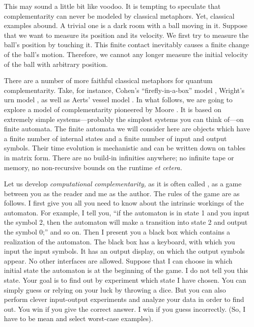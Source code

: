 This may sound a little bit like voodoo.
It is tempting to speculate that complementarity can never be modeled
by classical metaphors. Yet, classical examples abound.
A trivial one is a dark room with a ball moving in it. Suppose
that we want to measure its position and its velocity.
We first try to measure the ball's position by touching it.
This finite contact inevitably causes a finite change of the ball's
motion. Therefore,  we cannot any longer measure the initial velocity
of the ball with arbitrary position.

There are a number of more faithful classical metaphors for quantum
complementarity.
Take, for instance, Cohen's ``firefly-in-a-box'' model \cite{Coh},
Wright's urn model
\cite{Wri},
as well as Aerts' vessel model \cite{Aerts}.
In what follows,
we are going to explore a model of complementarity pioneered by Moore
\cite{e-f-moore}. It is based on extremely simple systems---probably the
simplest systems you can think of---on finite automata.
The finite automata we will consider here are objects which have a
finite number of internal states and a finite number of input and output
symbols.
Their time evolution is mechanistic and can be written down on tables in
matrix form.
 There are no build-in
infinities anywhere; no infinite tape or memory, no non-recursive bounds
on the runtime {\it et cetera.}

Let us develop {\em computational complementarity,} as it is
often called \cite{finkelstein}, as a game between you as the reader
and me as the author. The rules of the game are as follows.
I first give you all you need to know about the intrinsic workings of
the
automaton. For example, I tell you, ``if the automaton is in state 1 and
you input the symbol 2, then the automaton will make a transition into
state 2 and output the symbol 0;'' and so on.
Then I present you a black box which contains a realization of the
automaton. The black box has a keyboard, with
which you input the input symbols. It has an output display, on which
the output symbols appear. No other interfaces are allowed.
Suppose that I can choose in which initial state the automaton is at the
beginning of the game. I do not tell you this state. Your goal is to
find out by experiment which state I have chosen. You can simply guess
or relying on your luck by throwing a dice. But you can also perform
clever input-output experiments and analyze
your data in order to find out. You win if you give the correct answer.
I win if you guess incorrectly. (So, I have to be mean and select
worst-case examples).

